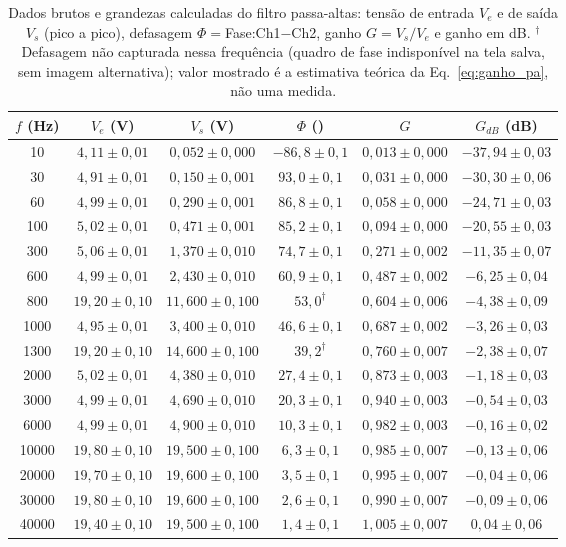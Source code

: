 \documentclass[reprint,amsmath,amssymb,aps,prl,floatfix,onecolumn]{revtex4-2}
\begin{document}
\begin{table}[htb]
	\caption{\label{tab:pa} Dados brutos e grandezas calculadas do filtro passa-altas: tensão de entrada $V_e$ e de saída $V_s$ (pico a pico), defasagem $\Phi=$Fase:Ch1$-$Ch2, ganho $G=V_s/V_e$ e ganho em dB. $^\dagger$Defasagem não capturada nessa frequência (quadro de fase indisponível na tela salva, sem imagem alternativa); valor mostrado é a estimativa teórica da Eq.~\eqref{eq:ganho_pa}, não uma medida.}
	\begin{tabular}{cccccc}
		\hline\hline
		$f$ (Hz) & $V_e$ (V) & $V_s$ (V) & $\Phi$ (\textdegree) & $G$ & $G_{dB}$ (dB) \\ \hline
		10 & $4{,}11\pm0{,}01$ & $0{,}052\pm0{,}000$ & $-86{,}8\pm0{,}1$ & $0{,}013\pm0{,}000$ & $-37{,}94\pm0{,}03$ \\
		30 & $4{,}91\pm0{,}01$ & $0{,}150\pm0{,}001$ & $93{,}0\pm0{,}1$ & $0{,}031\pm0{,}000$ & $-30{,}30\pm0{,}06$ \\
		60 & $4{,}99\pm0{,}01$ & $0{,}290\pm0{,}001$ & $86{,}8\pm0{,}1$ & $0{,}058\pm0{,}000$ & $-24{,}71\pm0{,}03$ \\
		100 & $5{,}02\pm0{,}01$ & $0{,}471\pm0{,}001$ & $85{,}2\pm0{,}1$ & $0{,}094\pm0{,}000$ & $-20{,}55\pm0{,}03$ \\
		300 & $5{,}06\pm0{,}01$ & $1{,}370\pm0{,}010$ & $74{,}7\pm0{,}1$ & $0{,}271\pm0{,}002$ & $-11{,}35\pm0{,}07$ \\
		600 & $4{,}99\pm0{,}01$ & $2{,}430\pm0{,}010$ & $60{,}9\pm0{,}1$ & $0{,}487\pm0{,}002$ & $-6{,}25\pm0{,}04$ \\
		800 & $19{,}20\pm0{,}10$ & $11{,}600\pm0{,}100$ & $53{,}0^\dagger$ & $0{,}604\pm0{,}006$ & $-4{,}38\pm0{,}09$ \\
		1000 & $4{,}95\pm0{,}01$ & $3{,}400\pm0{,}010$ & $46{,}6\pm0{,}1$ & $0{,}687\pm0{,}002$ & $-3{,}26\pm0{,}03$ \\
		1300 & $19{,}20\pm0{,}10$ & $14{,}600\pm0{,}100$ & $39{,}2^\dagger$ & $0{,}760\pm0{,}007$ & $-2{,}38\pm0{,}07$ \\
		2000 & $5{,}02\pm0{,}01$ & $4{,}380\pm0{,}010$ & $27{,}4\pm0{,}1$ & $0{,}873\pm0{,}003$ & $-1{,}18\pm0{,}03$ \\
		3000 & $4{,}99\pm0{,}01$ & $4{,}690\pm0{,}010$ & $20{,}3\pm0{,}1$ & $0{,}940\pm0{,}003$ & $-0{,}54\pm0{,}03$ \\
		6000 & $4{,}99\pm0{,}01$ & $4{,}900\pm0{,}010$ & $10{,}3\pm0{,}1$ & $0{,}982\pm0{,}003$ & $-0{,}16\pm0{,}02$ \\
		10000 & $19{,}80\pm0{,}10$ & $19{,}500\pm0{,}100$ & $6{,}3\pm0{,}1$ & $0{,}985\pm0{,}007$ & $-0{,}13\pm0{,}06$ \\
		20000 & $19{,}70\pm0{,}10$ & $19{,}600\pm0{,}100$ & $3{,}5\pm0{,}1$ & $0{,}995\pm0{,}007$ & $-0{,}04\pm0{,}06$ \\
		30000 & $19{,}80\pm0{,}10$ & $19{,}600\pm0{,}100$ & $2{,}6\pm0{,}1$ & $0{,}990\pm0{,}007$ & $-0{,}09\pm0{,}06$ \\
		40000 & $19{,}40\pm0{,}10$ & $19{,}500\pm0{,}100$ & $1{,}4\pm0{,}1$ & $1{,}005\pm0{,}007$ & $0{,}04\pm0{,}06$ \\ \hline\hline
	\end{tabular}
\end{table}
\end{document}
